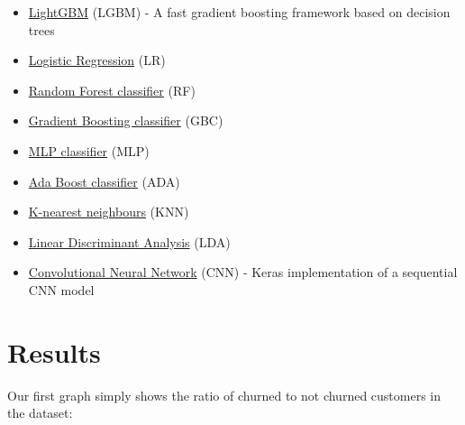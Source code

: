 \documentclass[]{article}
\begin{document}
\begin{itemize}
	\item \href{https://github.com/microsoft/LightGBM}{LightGBM} (LGBM) - A fast gradient boosting framework based on decision trees
	\item \href{https://scikit-learn.org/stable/modules/generated/sklearn.linear_model.LogisticRegression.html}{Logistic Regression} (LR)
	\item \href{https://scikit-learn.org/stable/modules/generated/sklearn.ensemble.RandomForestClassifier.html}{Random Forest classifier} (RF)
	\item \href{https://scikit-learn.org/stable/modules/generated/sklearn.ensemble.GradientBoostingClassifier.html}{Gradient Boosting classifier} (GBC)
	\item \href{https://scikit-learn.org/stable/modules/generated/sklearn.neural_network.MLPClassifier.html}{MLP classifier} (MLP)
	\item \href{https://scikit-learn.org/stable/modules/generated/sklearn.ensemble.AdaBoostClassifier.html}{Ada Boost classifier} (ADA)
	\item \href{https://scikit-learn.org/stable/modules/generated/sklearn.neighbors.KNeighborsClassifier.html}{K-nearest neighbours} (KNN)
	\item \href{https://scikit-learn.org/stable/modules/generated/sklearn.discriminant_analysis.LinearDiscriminantAnalysis.html}{Linear Discriminant Analysis} (LDA)
	\item \href{https://keras.io/api/models/sequential/#sequential-class}{Convolutional Neural Network} (CNN) - Keras implementation of a sequential CNN model
\end{itemize}

\section{Results}

Our first graph simply shows the ratio of churned to not churned customers in the dataset:
\end{document}
